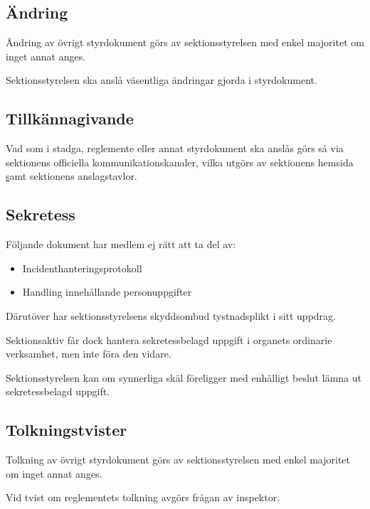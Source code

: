 \documentclass{styrdokument}
\begin{document}
\subsection{Ändring}
\? Ändring av övrigt styrdokument görs av sektionsstyrelsen med enkel majoritet om inget annat anges.

\? Sektionsstyrelsen ska anslå väsentliga ändringar gjorda i styrdokument.

\subsection{Tillkännagivande}
\? Vad som i stadga, reglemente eller annat styrdokument ska anslås görs så via sektionens officiella kommunikationskanaler, vilka utgörs av sektionens hemsida \href{ftek.se} samt sektionens anslagstavlor.

\subsection{Sekretess}
\? Följande dokument har medlem ej rätt att ta del av:
\begin{itemize}
    \item Incidenthanteringsprotokoll
    \item Handling innehållande personuppgifter
\end{itemize}

\? Därutöver har sektionsstyrelsens skyddsombud tystnadsplikt i sitt uppdrag.

\? Sektionsaktiv får dock hantera sekretessbelagd uppgift i organets ordinarie verksamhet, men inte föra den vidare.

\? Sektionsstyrelsen kan om synnerliga skäl föreligger med enhälligt beslut lämna ut sekretessbelagd uppgift.

\subsection{Tolkningstvister}
\? Tolkning av övrigt styrdokument görs av sektionsstyrelsen med enkel majoritet om inget annat anges.

\? Vid tvist om reglementets tolkning avgörs frågan av inspektor.

\end{document}
